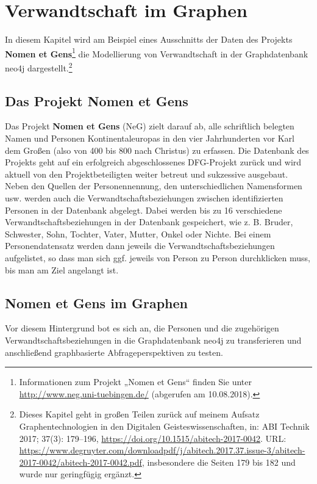 \documentclass[ngerman,]{scrreprt}
\begin{document}
\chapter{Verwandtschaft im Graphen}\label{verwandtschaft-im-graphen}

In diesem Kapitel wird am Beispiel eines Ausschnitts der Daten des Projekts \textbf{Nomen et Gens}\footnote{Informationen zum Projekt „Nomen et Gens`` finden Sie unter \url{http://www.neg.uni-tuebingen.de/} (abgerufen am 10.08.2018).} die Modellierung von Verwandtschaft in der Graphdatenbank neo4j dargestellt.\footnote{Dieses Kapitel geht in großen Teilen zurück auf meinem Aufsatz Graphentechnologien in den Digitalen Geisteswissenschaften, in: ABI Technik 2017; 37(3): 179--196, \url{https://doi.org/10.1515/abitech-2017-0042}. URL: \url{https://www.degruyter.com/downloadpdf/j/abitech.2017.37.issue-3/abitech-2017-0042/abitech-2017-0042.pdf}, insbesondere die Seiten 179 bis 182 und wurde nur geringfügig ergänzt.}

\section{Das Projekt Nomen et Gens}\label{das-projekt-nomen-et-gens}

Das Projekt \textbf{Nomen et Gens} (NeG) zielt darauf ab, alle schriftlich belegten Namen und Personen Kontinentaleuropas in den vier Jahrhunderten vor Karl dem Großen (also von 400 bis 800 nach Christus) zu erfassen. Die Datenbank des Projekts geht auf ein erfolgreich abgeschlossenes DFG-Projekt zurück und wird aktuell von den Projektbeteiligten weiter betreut und sukzessive ausgebaut. Neben den Quellen der Personennennung, den unterschiedlichen Namensformen usw. werden auch die Verwandtschaftsbeziehungen zwischen identifizierten Personen in der Datenbank abgelegt. Dabei werden bis zu 16 verschiedene Verwandtschaftsbeziehungen in der Datenbank gespeichert, wie z. B. Bruder, Schwester, Sohn, Tochter, Vater, Mutter, Onkel oder Nichte. Bei einem Personendatensatz werden dann jeweils die Verwandtschaftsbeziehungen aufgelistet, so dass man sich ggf. jeweils von Person zu Person durchklicken muss, bis man am Ziel angelangt ist.

\section{Nomen et Gens im Graphen}\label{nomen-et-gens-im-graphen}

Vor diesem Hintergrund bot es sich an, die Personen und die zugehörigen Verwandtschaftsbeziehungen in die Graphdatenbank neo4j zu transferieren und anschließend graphbasierte Abfrageperspektiven zu testen.
\end{document}
